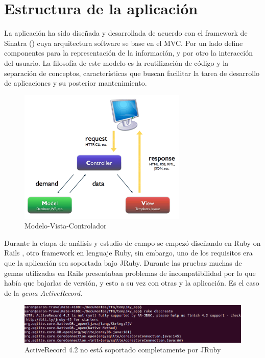 \section{Estructura de la aplicación}\label{cap.4.2}
La aplicación ha sido diseñada y desarrollada de acuerdo con el framework de Sinatra (\cite{URL:Sinatra}) cuya arquitectura software se base en el MVC. Por un lado define componentes para la representación de la información, y por otro la interacción del usuario. La filosofía de este modelo es la reutilización de código y la separación de conceptos, características que buscan facilitar la tarea de desarrollo de aplicaciones y su posterior mantenimiento. \\

\begin{figure}[H]
	\centering
	\includegraphics[width=8cm]{./images/mvc.png}
	\caption{Modelo-Vista-Controlador} \label{fig:MVC}
\end{figure}

Durante la etapa de análisis y estudio de campo se empezó diseñando en Ruby on Rails \cite{URL:Rails}, otro framework en lenguaje Ruby, sin embargo, uno de los requisitos era que la aplicación sea soportada bajo JRuby. Durante las pruebas muchas de gemas utilizadas en Rails presentaban problemas de incompatibilidad por lo que había que bajarlas de versión, y esto a su vez con otras y la aplicación. Es el caso de la \emph{gema ActiveRecord}. 

\begin{figure}[H]
	\centering
	\includegraphics[width=12cm]{./images/activerecord-message.png}
	\caption{ActiveRecord 4.2 no está soportado completamente por JRuby} \label{fig:AvtiveRecord-no-supported}
\end{figure}

